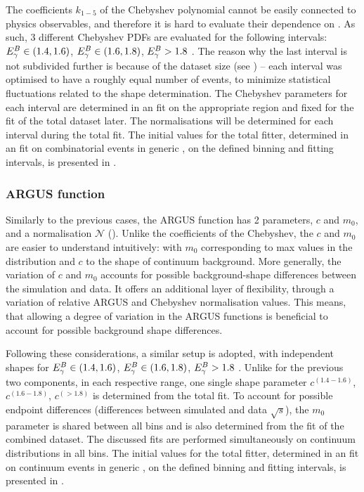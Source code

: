 The coefficients $k_{1-5}$ of the Chebyshev polynomial cannot be easily connected to physics observables,
and therefore it is hard to evaluate their dependence on \EB.
As such, 3 different Chebyshev PDFs are evaluated for the following intervals: ${E^B_{\gamma}}\in(1.4,1.6)$, ${E^B_{\gamma}}\in(1.6,1.8)$, ${E^B_{\gamma}}>1.8$ \gev.
The reason why the last interval is not subdivided further is because of the dataset size (see ) -- each interval was optimised to have a roughly equal number of events, to minimize statistical fluctuations related to the shape determination.
The Chebyshev \PDF parameters for each interval are determined in an \Mbc fit on the appropriate region and fixed for the fit of the total dataset later.
The normalisations will be determined for each \EB interval during the total fit.
The initial values for the total fitter, determined in an \Mbc fit on combinatorial \BB events in generic \MC, on the defined \EB binning and fitting intervals, is presented in .

\subsubsection{ARGUS function}\label{sec:argus_prefit}

Similarly to the previous cases, the ARGUS function has 2 parameters, $c$ and $m_0$, and a normalisation $\mathcal{N}$ ().
Unlike the coefficients of the Chebyshev, the $c$ and $m_0$ are easier to understand intuitively: with $m_0$ corresponding to max \Mbc values in the distribution and $c$ to the shape of continuum background.
More generally, the variation of $c$ and $m_0$ accounts for possible background-shape differences between the simulation and data.
It offers an additional layer of flexibility, through a variation of relative ARGUS and Chebyshev normalisation values.
This means, that allowing a degree of variation in the ARGUS functions is beneficial to account for possible background shape differences.

Following these considerations, a similar setup is adopted, with independent shapes for  ${E^B_{\gamma}}\in(1.4,1.6)$, ${E^B_{\gamma}}\in(1.6,1.8)$, ${E^B_{\gamma}}>1.8$ \gev.
Unlike for the previous two components, in each respective range, one single shape parameter $c^{(1.4-1.6)}$, $c^{(1.6-1.8)}$, $c^{(>1.8)}$ is determined from the total fit.
To account for possible endpoint differences (differences between simulated and data $\sqrt{s}$), the $m_0$ parameter is shared between all bins and is also determined from the fit of the combined dataset.
The discussed fits are performed simultaneously on continuum \Mbc distributions in all \EB bins.
The initial values for the total fitter, determined in an \Mbc fit on continuum events in generic \MC, on the defined \EB binning and fitting intervals, is presented in .


